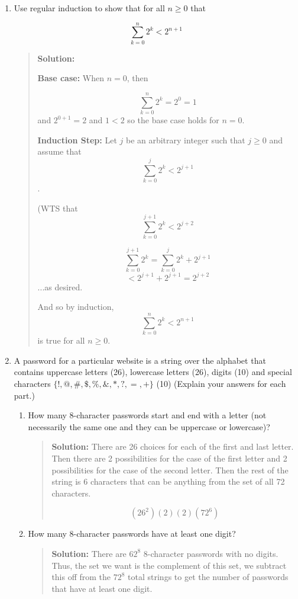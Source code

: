\documentclass[10pt,letterpaper,unboxed,cm]{article}
\begin{document}
\begin{enumerate}

\item
Use regular induction to show that for all $n\geq 0$ that

$$\sum_{k=0}^n 2^k < 2^{n+1}$$
\begin{quote}
{\bf Solution:}

{\bf Base case:} When $n=0$, then 

$$\sum_{k=0}^n 2^k = 2^0 = 1$$ and $2^{0+1} = 2$ and $1<2$ so the base case holds for $n=0$.

{\bf Induction Step:} Let $j$ be an arbitrary integer such that $j\geq 0$ and assume that 
$$\sum_{k=0}^j 2^k < 2^{j+1}$$.

(WTS that 
$$\sum_{k=0}^{j+1} 2^k < 2^{j+2}$$

$$\sum_{k=0}^{j+1} 2^k = \sum_{k=0}^{j} 2^k + 2^{j+1}$$
$$<2^{j+1} + 2^{j+1} = 2^{j+2}$$
...as desired.

And so by induction, 
$$\sum_{k=0}^n 2^k < 2^{n+1}$$
is true for all $n\geq 0$.
\end{quote}


\item
A password for a particular website is a string over the alphabet that contains uppercase letters (26), lowercase letters (26), digits (10) and special characters $\{!,@,\#,\$,\%,\&,*,?,=,+\}$ (10)
(Explain your answers for each part.)
\begin{enumerate}



\item

How many 8-character passwords start and end with a letter (not necessarily the same one and they can be uppercase or lowercase)?

\begin{quote}
{\bf Solution:}
There are 26 choices for each of the first and last letter. Then there are 2 possibilities for the case of the first letter and 2 possibilities for the case of the second letter. Then the rest of the string is 6 characters that can be anything from the set of all 72 characters.

$$(26^2)(2)(2)(72^6)$$
\end{quote}



\item

How many 8-character passwords have at least one digit?
\begin{quote}
{\bf Solution:}
There are $62^8$ 8-character passwords with no digits. Thus, the set we want is the complement of this set, we subtract this off from the $72^8$ total strings to get the number of passwords that have at least one digit.


\end{quote}
\end{enumerate}
\end{enumerate}
\end{document}
